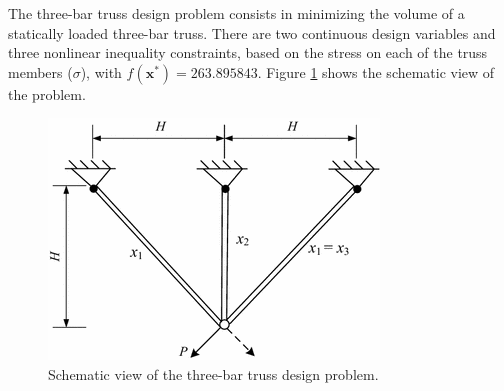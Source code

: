

The three-bar truss design problem \cite{TB} consists in minimizing the volume of a statically loaded three-bar truss. There are two continuous design variables and three nonlinear inequality constraints, based on the stress on each of the truss members ($\sigma$), with $f(\bm{x}^*) = 263.895843$. Figure \ref{fig:TB} shows the schematic view of the problem. %


%

\vspace{0.5cm}


\begin{figure}[h]
    \begin{center}
    \includegraphics[scale=0.5]{img/Problems/TB.png}
    \end{center}
    \captionsetup{justification=centering}
    \caption{Schematic view of the three-bar truss design problem.}\label{fig:TB}
\end{figure}
